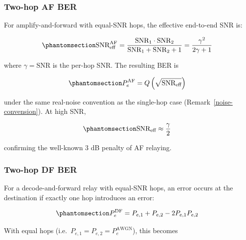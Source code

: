 \subsubsection{Two-hop AF BER}\label{sec:awgn-two-hop-af-ber}
For amplify-and-forward with equal-SNR hops, the effective end-to-end SNR is:

\begin{equation}\protect\phantomsection\label{eq:af-snr-eff}{\text{SNR}_{\text{eff}}^{\text{AF}} = \frac{\text{SNR}_1 \cdot \text{SNR}_2}{\text{SNR}_1 + \text{SNR}_2 + 1} = \frac{\gamma^2}{2\gamma + 1}
}\end{equation}

where
\(\gamma = \text{SNR}\) is the per-hop SNR. The resulting BER is

\begin{equation}\protect\phantomsection\label{eq:af-p-eff}{P_e^{\text{AF}} = Q\left(\sqrt{\text{SNR}_{\text{eff}}}\right)
}\end{equation}

under the same real-noise convention as the single-hop case (Remark~\ref{noise-convension}). At high SNR,

\begin{equation}\protect\phantomsection\label{eq:gamma-high-snr}{\text{SNR}_{\text{eff}} \approx \frac{\gamma}{2}}
\end{equation}

confirming the well-known 3 dB penalty of AF relaying.

\subsubsection{Two-hop DF BER}\label{sec:awgn-two-hop-df-ber}
For a decode-and-forward relay with equal-SNR hops, an error occurs at the destination if exactly one hop introduces an error:

\begin{equation}\protect\phantomsection\label{eq:df-ber-awgn}{P_e^{\text{DF}} = P_{e,1} + P_{e,2} - 2P_{e,1}P_{e,2}
}\end{equation}

With equal hops (i.e.\ \(P_{e,1} = P_{e,2} = P_e^{\text{AWGN}}\)), this becomes

